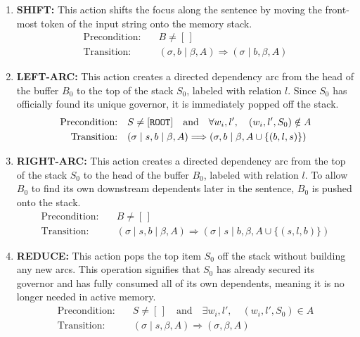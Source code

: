 \documentclass[12pt,a4paper]{article}
\begin{document}
\begin{enumerate}
    \item \textbf{SHIFT:} This action shifts the focus along the sentence by moving the front-most token of the input string onto the memory stack.
    \begin{align}
        \text{Precondition:} \quad & B \neq [\,] \\
        \text{Transition:} \quad & (\sigma, b \mid \beta, A) \Longrightarrow (\sigma \mid b, \beta, A)
    \end{align}
    
    \item \textbf{LEFT-ARC:} This action creates a directed dependency arc from the head of the buffer $B_0$ to the top of the stack $S_0$, labeled with relation $l$. Since $S_0$ has officially found its unique governor, it is immediately popped off the stack.
    \begin{align}
        \text{Precondition:} \quad & S \neq [\text{\texttt{ROOT}}] \quad \text{and} \quad \forall w_i, l', \quad (w_i, l', S_0) \notin A \\
        \text{Transition:} \quad & (\sigma \mid s, b \mid \beta, A) \Longrightarrow (\sigma, b \mid \beta, A \cup \{(b, l, s)\})
    \end{align}
    
    \item \textbf{RIGHT-ARC:} This action creates a directed dependency arc from the top of the stack $S_0$ to the head of the buffer $B_0$, labeled with relation $l$. To allow $B_0$ to find its own downstream dependents later in the sentence, $B_0$ is pushed onto the stack.
    \begin{align}
        \text{Precondition:} \quad & B \neq [\,] \\
        \text{Transition:} \quad & (\sigma \mid s, b \mid \beta, A) \Longrightarrow (\sigma \mid s \mid b, \beta, A \cup \{(s, l, b)\})
    \end{align}
    
    \item \textbf{REDUCE:} This action pops the top item $S_0$ off the stack without building any new arcs. This operation signifies that $S_0$ has already secured its governor and has fully consumed all of its own dependents, meaning it is no longer needed in active memory.
    \begin{align}
        \text{Precondition:} \quad & S \neq [\,] \quad \text{and} \quad \exists w_i, l', \quad (w_i, l', S_0) \in A \\
        \text{Transition:} \quad & (\sigma \mid s, \beta, A) \Longrightarrow (\sigma, \beta, A)
    \end{align}
\end{enumerate}
\end{document}
